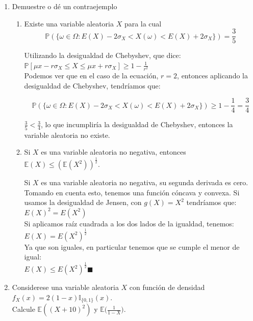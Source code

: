 \documentclass[12pt,a4paper]{report}
\begin{document}
\begin{enumerate}
		\item{
			Demuestre o dé un contraejemplo
			\begin{enumerate}
				\item {
					Existe una variable aleatoria $X$ para la cual
					\[\mathbb{P}(\{\omega \in \Omega : E(X) - 2\sigma_X <
					X(\omega) <
					E(X) + 2\sigma_X\}) = \frac{3}{5}\]


					Utilizando la desigualdad de Chebyshev, que dice:\\
					$\mathbb{P}[ \mu x - r\sigma_X \leq X \leq \mu x + r\sigma_X] \geq 1 - \frac{1}{r^2}$\\

				Podemos ver que en el caso de la ecuación, $r = 2$, entonces aplicando la desigualdad de Chebyshev, tendríamos que:

				\[\mathbb{P}(\{\omega \in \Omega : E(X) - 2\sigma_X <
					X(\omega) <
					E(X) + 2\sigma_X\}) \geq 1 - \frac{1}{4} = \frac{3}{4}\]

					$\frac{3}{5} < \frac{3}{4}$, lo que incumpliría la desigualdad de Chebyshev, entonces la variable aleatoria no existe.\\


				}

				\item {
					Si $X$ es una variable aleatoria no negativa, entonces
					$\mathbb{E}(X) \leq (\mathbb{E}(X^2))^{\frac{1}{2}}$.

					Si $X$ es una variable aleatoria no negativa, su segunda derivada es cero. Tomando en cuenta esto, tenemos una función cóncava y convexa. Si usamos la desigualdad de Jensen, con $g(X) = X^2$ tendríamos que:\\

					$E(X)^2 = E(X^2)$\\

					Si aplicamos raíz cuadrada a los dos lados de la igualdad, tenemos:\\
					$E(X) = E(X^2)^{\frac{1}{2}}$\\

					Ya que son iguales, en particular tenemos que se cumple el menor de igual:\\
					$E(X) \leq E(X^2)^{\frac{1}{2}}\blacksquare$

				}
			\end{enumerate}
		}

		\item{
			Considerese una variable aleatoria $X$ con función de densidad
			$f_X(x) = 2(1-x)\mathbb{I}_{\{0, 1\}}(x)$.\\
			Calcule $\mathbb{E}((X+10)^2)$ y
			$\mathbb{E}\Big(\frac{1}{1-X}\Big)$.

}
\end{enumerate}
\end{document}
